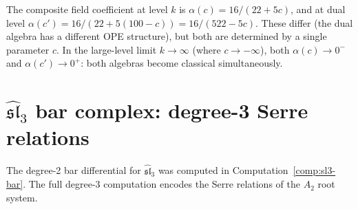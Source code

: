 \begin{computation}
The composite field coefficient at level $k$ is $\alpha(c) = 16/(22+5c)$, and
at dual level $\alpha(c') = 16/(22+5(100-c)) = 16/(522-5c)$.
These differ (the dual algebra has a different OPE structure), but both are
determined by a single parameter $c$. In the large-level limit $k \to \infty$
(where $c \to -\infty$), both $\alpha(c) \to 0^-$ and
$\alpha(c') \to 0^+$: both algebras become classical simultaneously.
\end{computation}


\section{\texorpdfstring{$\widehat{\mathfrak{sl}}_3$ bar complex: degree-3 Serre relations}{sl-3 bar complex: degree-3 Serre relations}}

The degree-2 bar differential for $\widehat{\mathfrak{sl}}_3$ was computed in
Computation~\ref{comp:sl3-bar}. The full degree-3
computation encodes the Serre relations of the $A_2$ root system.

